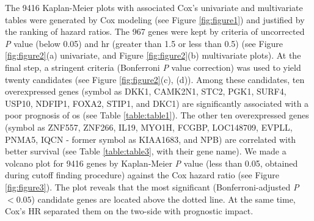 \documentclass[12pt, a4paper]{article}
\begin{document}
The 9416 Kaplan-Meier plots with associated Cox's univariate and multivariate tables were generated by Cox modeling (see Figure \ref{fig:figure1}) and justified by the ranking of hazard ratios.
The 967 genes were kept by criteria of uncorrected \textit{P} value (below 0.05) and \acrfull{hr} (greater than 1.5 or less than 0.5) (see Figure \ref{fig:figure2}(a) univariate, and Figure \ref{fig:figure2}(b) multivariate plots). 
At the final step, a stringent criteria (Bonferroni \textit{P} value correction) was used to yield twenty candidates (see Figure \ref{fig:figure2}(c), (d)). 
Among these candidates, ten overexpressed genes (symbol as DKK1, CAMK2N1, STC2, PGK1, SURF4, USP10, NDFIP1, FOXA2, STIP1, and DKC1) are significantly associated with a poor prognosis of  \acrshort{os} (see Table \ref{table:table1}). 
The other ten overexpressed genes (symbol as ZNF557, ZNF266, IL19, MYO1H, FCGBP, LOC148709, EVPLL, PNMA5, IQCN - former symbol as KIAA1683, and NPB) are correlated with better survival (see Table \ref{table:table3}, with their gene name).
We made a volcano plot for 9416 genes by Kaplan-Meier \textit{P} value (less than 0.05, obtained during cutoff finding procedure) against the Cox hazard ratio (see Figure \ref{fig:figure3}). The plot reveals that the most significant (Bonferroni-adjusted \textit{P} $< 0.05$) candidate genes are located above the dotted line. At the same time, Cox's HR separated them on the two-side with prognostic impact.
\end{document}
